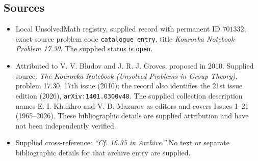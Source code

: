 \documentclass[11pt]{article}
\begin{document}
\subsection{Sources}
\begin{itemize}
\item Local UnsolvedMath registry, supplied record with permanent ID \(701332\), exact source problem code \texttt{catalogue entry}, title \emph{Kourovka Notebook Problem 17.30}. The supplied status is \texttt{open}.
\item Attributed to V. V. Bludov and J. R. J. Groves, proposed in 2010. Supplied source: \emph{The Kourovka Notebook (Unsolved Problems in Group Theory)}, problem 17.30, 17th issue (2010); the record also identifies the 21st issue edition (2026), \texttt{arXiv:1401.0300v48}. The supplied collection description names E. I. Khukhro and V. D. Mazurov as editors and covers Issues 1--21 (1965--2026). These bibliographic details are supplied attribution and have not been independently verified.
\item Supplied cross-reference: \emph{``Cf. 16.35 in Archive.''} No text or separate bibliographic details for that archive entry are supplied.
\end{itemize}
\end{document}
